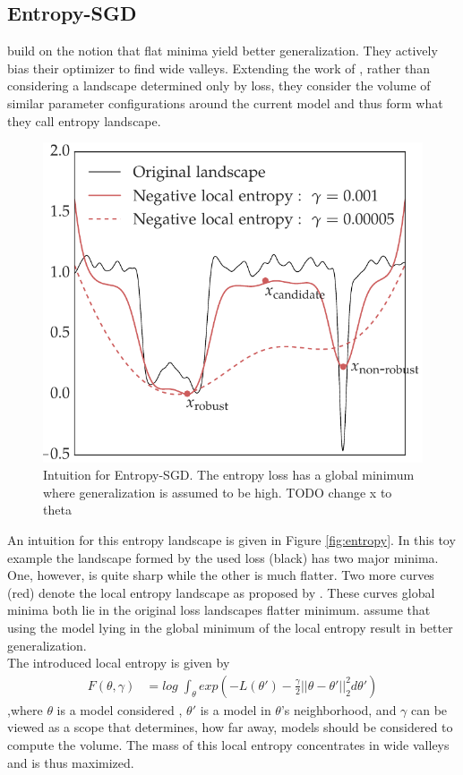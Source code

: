 \documentclass[a4paper]{scrartcl}
\begin{document}
\subsection*{Entropy-SGD}
\cite{chaudhari2019entropy} build on the notion that flat minima yield better generalization. They actively bias their optimizer to find wide valleys. Extending the work of \cite{baldassi2016unreasonable}, rather than considering a landscape determined only by loss, they consider the volume of similar parameter configurations around the current model and thus form what they call entropy landscape.
\label{fig:entropy}
\begin{figure}[H]
	\centering
	\includegraphics[width=.6\linewidth]{figures/entropy_1.png}
	\caption{Intuition for Entropy-SGD. The entropy loss has a global minimum where generalization is assumed to be high. TODO change x to theta}
\end{figure}
An intuition for this entropy landscape is given in Figure \ref{fig:entropy}. In this toy example the landscape formed by the used loss (black) has two major minima. One, however, is quite sharp while the other is much flatter. Two more curves (red) denote the local entropy landscape as proposed by \cite{chaudhari2019entropy}. These curves global minima both lie in the original loss landscapes flatter minimum. \cite{chaudhari2019entropy} assume that using the model lying in the global minimum of the local entropy result in better generalization.\\
The introduced local entropy is given by
\begin{align}
	F(\theta, \gamma) &= log\; \int_\theta exp(-L(\theta') - \frac{\gamma}{2}||\theta-\theta'||_2^2 d\theta') 
\end{align},where $\theta$ is a model considered , $\theta'$ is a model in $\theta$'s neighborhood, and $\gamma$ can be viewed as a scope that determines, how far away, models should be considered to compute the volume. The mass of this local entropy concentrates in wide valleys and is thus maximized.\\
\end{document}
